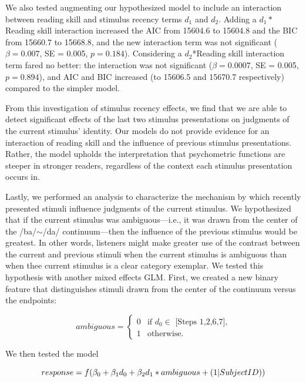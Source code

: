 \documentclass[../uwthesis.tex]{subfiles}
\begin{document}
We also tested augmenting our hypothesized model to include an interaction between reading skill and stimulus recency terms $d_1$ and $d_2$. Adding a $d_1*$Reading skill interaction increased the AIC from 15604.6 to 15604.8 and the BIC from 15660.7 to 15668.8, and the new interaction term was not significant ($\beta = 0.007$, SE = 0.005, $p= 0.184$).  Considering a $d_2$*Reading skill interaction term fared no better: the interaction was not significant ($\beta = 0.0007$, SE = 0.005, $p=0.894$), and AIC and BIC increased (to 15606.5 and 15670.7 respectively) compared to the simpler model. 

From this investigation of stimulus recency effects, we find that we are able to detect significant effects of the last two stimulus presentations on judgments of the current stimulus' identity. Our models do not provide evidence for an interaction of reading skill and the influence of previous stimulus presentations. Rather, the model upholds the interpretation that psychometric functions are steeper in stronger readers, regardless of the context each stimulus presentation occurs in.  

Lastly, we performed an analysis to characterize the mechanism by which recently presented stimuli influence judgments of the current stimulus. We hypothesized that if the current stimulus was ambiguous---i.e., it was drawn from the center of the /ba/$\sim$/da/ continuum---then the influence of the previous stimulus would be greatest. In other words, listeners might make greater use of the contrast between the current and previous stimuli when the current stimulus is ambiguous than when thee current stimulus is a clear category exemplar. We tested this hypothesis with another mixed effects GLM. First, we created a new binary feature that distinguishes stimuli drawn from the center of the continuum versus the endpoints:

\[
    ambiguous =
    \begin{cases}
        0 & \text{if $d_0 \in$ [Steps 1,2,6,7],}\\
        1 & \text{otherwise.}
    \end{cases}
\]


We then tested the model

\begin{equation}
\centering
response = f(\beta_0 + \beta_1d_0 + \beta_2d_1*ambiguous + (1|Subject ID))
\end{equation}
\end{document}
